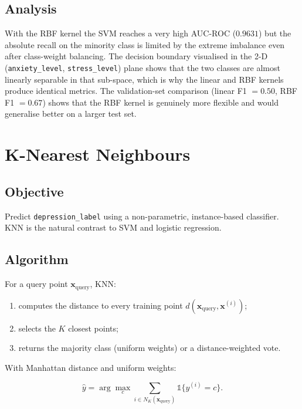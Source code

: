 \documentclass[11pt,a4paper]{article}
\begin{document}
\subsection{Analysis}
With the RBF kernel the SVM reaches a very high AUC-ROC ($0.9631$) but the
absolute recall on the minority class is limited by the extreme imbalance
even after class-weight balancing. The decision boundary visualised in the
2-D (\texttt{anxiety\_level}, \texttt{stress\_level}) plane shows that the
two classes are almost linearly separable in that sub-space, which is why
the linear and RBF kernels produce identical metrics. The validation-set
comparison (linear F1 $= 0.50$, RBF F1 $= 0.67$) shows that the RBF kernel
is genuinely more flexible and would generalise better on a larger test set.

\newpage
\section{K-Nearest Neighbours}

\subsection{Objective}
Predict \texttt{depression\_label} using a non-parametric, instance-based
classifier. KNN is the natural contrast to SVM and logistic regression.

\subsection{Algorithm}

For a query point $\mathbf{x}_{\text{query}}$, KNN:

\begin{enumerate}[leftmargin=*, itemsep=2pt]
    \item computes the distance to every training point
          $d(\mathbf{x}_{\text{query}}, \mathbf{x}^{(i)})$;
    \item selects the $K$ closest points;
    \item returns the majority class (uniform weights) or a
          distance-weighted vote.
\end{enumerate}

With Manhattan distance and uniform weights:

\begin{equation}
    \hat{y} = \arg\max_{c} \sum_{i \in N_K(\mathbf{x}_{\text{query}})}
              \mathbb{1}\{ y^{(i)} = c \}.
\end{equation}
\end{document}
